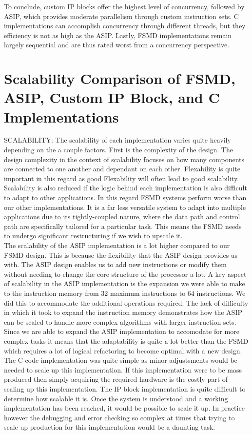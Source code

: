 \documentclass[conference]{IEEEtran}
\begin{document}
To conclude, custom IP blocks offer the highest level of concurrency, followed by ASIP, which provides moderate parallelism through custom instruction sets. C implementations can accomplish concurrency through different threads, but they efficiency is not as high as the ASIP. Lastly, FSMD implementations remain largely sequential and are thus rated worst from a concurrency perspective.\\

\section{Scalability Comparison of FSMD, ASIP, Custom IP Block, and C Implementations}
SCALABILITY:
The scalability of each implementation varies quite heavily depending on the a couple factors. First is the complexity of the design. The design complexity in the context of scalability focuses on how many components are connected to one another and dependant on each other. Flexability is quite important in this regard as good Flexability will often lead to good scalability. Scalability is also reduced if the logic behind each implementation is also difficult to adapt to other applications. In this regard FSMD systems perform worse than our other implementations. It is a far less versatile system to adapt into multiple applications due to its tightly-coupled nature, where the data path and control path are specifically tailored for a particular task. This means the FSMD needs to undergo significant restructuring if we wish to upscale it.\\
The scalability of the ASIP implementation is a lot higher compared to our FSMD design. This is because the flexibility that the ASIP design provides us with. The ASIP design enables us to add new instructions or modify them without needing to change the core structure of the processor a lot. A key aspect of scalability in the ASIP implementation is the expansion we were able to make to the instruction memory from 32 maximum instructions to 64 instructions. We did this to accommodate the additional operations required. The lack of difficulty in which it took to expand the instruction memory demonstrates how the ASIP can be scaled to handle more complex algorithms with larger instruction sets. Since we are able to expand the ASIP implementation to accomodate for more complex tasks it means that the adaptability is quite a lot better than the FSMD which requires a lot of logical refactoring to become optimal with a new design.\\
The C-code implementation was quite simple as minor adjustsments would be needed to scale up this implementation. If this implementation were to be mass produced then simply acquiring the required hardware is the costly part of scaling up this implementation. The IP block implementation is quite difficult to determine how scalable it is. Once the system is understood and a working implementation has been reached, it would be possible to scale it up. In practice however the debugging and error checking so complex at times that trying to scale up production for this implementation would be a daunting task. 
\end{document}
